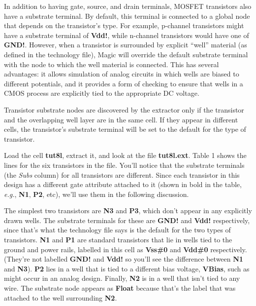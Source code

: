 \documentclass[letterpaper,twoside,12pt]{article}
\begin{document}
In addition to having gate, source, and drain terminals, MOSFET
transistors also have a substrate terminal.  By default,
this terminal is connected to a global node that depends
on the transistor's type.  For example, p-channel transistors
might have a substrate terminal of {\bfseries Vdd!}, while n-channel
transistors would have one of {\bfseries GND!}.
However, when a transistor is surrounded by explicit ``well'' material
(as defined in the technology file), Magic will override the
default substrate terminal with the node to which the well
material is connected.  This has several advantages: it allows
simulation of analog circuits in which wells are biased to
different potentials, and it provides a form of checking
to ensure that wells in a CMOS process are explicitly tied
to the appropriate DC voltage.

Transistor substrate nodes are discovered by the extractor only if
the transistor and the overlapping well layer are in the same cell.
If they appear in different cells, the transistor's substrate terminal
will be set to the default for the type of transistor.

Load the cell {\bfseries tut8l}, extract it, and look at the file
{\bfseries tut8l.ext}.  Table 1 shows the lines for the six
transistors in the file.  You'll notice that the substrate terminals
(the {\itshape Subs} column) for all transistors are different.
Since each transistor in this design has a different gate attribute attached
to it (shown in bold in the table, {\itshape e.g.}, {\bfseries N1},
{\bfseries P2}, etc), we'll use them in the following discussion.

The simplest two transistors are {\bfseries N3} and {\bfseries P3}, which don't
appear in any explicitly drawn wells.  The substrate terminals for
these are {\bfseries GND!} and {\bfseries Vdd!} respectively, since that's what
the technology file says is the default for the two types of transistors.
{\bfseries N1} and {\bfseries P1} are standard transistors that lie in wells tied
to the ground and power rails, labelled in this cell as {\bfseries Vss\#0}
and {\bfseries Vdd\#0} respectively.  (They're not labelled {\bfseries GND!} and
{\bfseries Vdd!} so you'll see the difference between {\bfseries N1} and {\bfseries N3}).
{\bfseries P2} lies in a well that is tied to a different bias voltage,
{\bfseries VBias}, such as might occur in an analog design.
Finally, {\bfseries N2} is in a well that isn't tied to any wire.
The substrate node appears as {\bfseries Float} because that's the label that
was attached to the well surrounding {\bfseries N2}.
\end{document}
